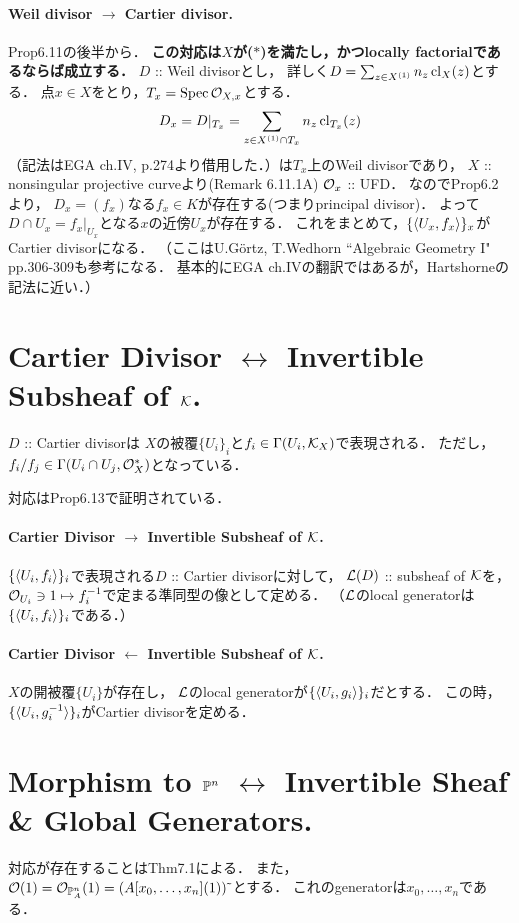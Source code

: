 \documentclass[a4paper]{jsarticle}
\begin{document}
    \paragraph{Weil divisor $\rightarrow$ Cartier divisor.}
    Prop6.11の後半から．
    \textbf{この対応は$X$が($*$)を満たし，かつlocally factorialであるならば成立する．}
    $D$ :: Weil divisorとし，
    詳しく$D=\sum_{z \in X^{(1)}} n_z \operatorname{cl}_X(z)$とする．
    点$x \in X$をとり，$T_x=\operatorname{Spec} \mathcal{O}_{X,x}$とする．
    \[ D_x=D|_{T_x}=\sum_{z \in X^{(1)} \cap T_x} n_z \operatorname{cl}_{T_x}(z) \]
    （記法はEGA ch.IV, p.274より借用した．）は$T_x$上のWeil divisorであり，
    $X$ :: nonsingular projective curveより(Remark 6.11.1A) $\mathcal{O}_x$ :: UFD．
    なのでProp6.2より，
    $D_x=(f_x)$なる$f_x \in K$が存在する(つまりprincipal divisor)．
    よって$D \cap U_x=f_x|_{U_x}$となる$x$の近傍$U_x$が存在する．
    これをまとめて，$\{\langle U_x,f_x \rangle\}_x$がCartier divisorになる．
    （ここはU.G\"ortz, T.Wedhorn ``Algebraic Geometry I" pp.306-309も参考になる．
    基本的にEGA ch.IVの翻訳ではあるが，Hartshorneの記法に近い．）

\section{Cartier Divisor $\leftrightarrow$ Invertible Subsheaf of $\mathcal{K}$.}
    $D$ :: Cartier divisorは
    $X$の被覆$\{U_i\}_i$と$f_i \in \Gamma(U_i, \mathcal{K}_X)$で表現される．
    ただし，$f_i/f_j \in \Gamma(U_i \cap U_j, \mathcal{O}_X^*)$となっている．

    対応はProp6.13で証明されている．
\paragraph{Cartier Divisor $\rightarrow$ Invertible Subsheaf of $\mathcal{K}$.}
    $\{\langle U_i,f_i \rangle\}_i$で表現される$D$ :: Cartier divisorに対して，
    $\mathcal{L}(D)$ :: subsheaf of $\mathcal{K}$を，
    $\mathcal{O}_{U_i} \ni 1 \mapsto f_i^{-1}$で定まる準同型の像として定める．
    （$\mathcal{L}$のlocal generatorは$\{\langle U_i,f_i \rangle\}_i$である．）

\paragraph{Cartier Divisor $\leftarrow$ Invertible Subsheaf of $\mathcal{K}$.}
    $X$の開被覆$\{U_i\}$が存在し，
    $\mathcal{L}$のlocal generatorが$\{\langle U_i,g_i \rangle\}_i$だとする．
    この時，$\{\langle U_i,g_i^{-1} \rangle\}_i$がCartier divisorを定める．

\section{Morphism to $\mathbb{P}^n$ $\leftrightarrow$ Invertible Sheaf \& Global Generators.}
    対応が存在することはThm7.1による．
    また，$\mathcal{O}(1)=\mathcal{O}_{\mathbb{P}_A^n}(1)=(A[x_0,\dots,x_n](1))\,\tilde{}\,$とする．
    これのgeneratorは$x_0,\dots,x_n$である．
\end{document}
